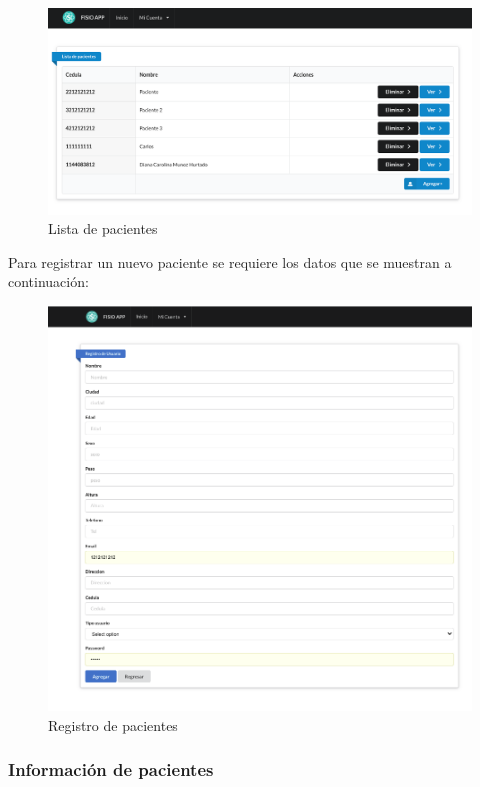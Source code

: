 \documentclass[12pt]{article}
\begin{document}
\begin{figure}[ht]
\centering
\includegraphics[scale=0.3]{imag/listpacientes.png}
\caption{Lista de pacientes}
\label{6}
\end{figure}
\FloatBarrier

Para registrar un nuevo paciente se requiere los datos que se muestran a continuación:

\begin{figure}[ht]
\centering
\includegraphics[scale=0.5]{imag/appregistrousuario.png}
\caption{Registro de pacientes}
\label{6}
\end{figure}
\FloatBarrier

\subsubsection{Información de pacientes}
\end{document}
